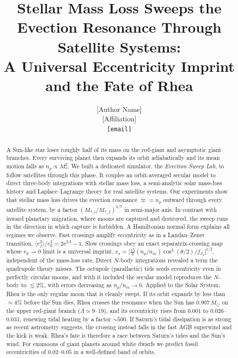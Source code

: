 \documentclass[11pt,a4paper]{article}
\title{\textbf{Stellar Mass Loss Sweeps the Evection Resonance Through Satellite Systems:\\ A Universal Eccentricity Imprint and the Fate of Rhea}}
\author{[Author Name]\\[2pt]
{\small [Affiliation]}\\
{\small \texttt{[email]}}}
\date{}
\newcommand{\estar}{e_\star}
\newcommand{\msun}{M_\odot}
\newcommand{\fJ}{f_{J_2}}
\begin{document}
\maketitle

\begin{abstract}
\noindent
A Sun-like star loses roughly half of its mass on the red-giant and asymptotic giant branches. Every surviving planet then expands its orbit adiabatically and its mean motion falls as $n_p\propto M_\ast^{2}$. We built a dedicated simulator, the \emph{Evection Sweep Lab}, to follow satellites through this phase. It couples an orbit-averaged secular model to direct three-body integrations with stellar mass loss, a semi-analytic solar mass-loss history and Laplace--Lagrange theory for real satellite systems. Our experiments show that stellar mass loss drives the evection resonance $\dot\varpi=n_p$ outward through every satellite system, by a factor $(M_{\ast,i}/M_{\ast,f})^{4/7}$ in semi-major axis. In contrast with inward planetary migration, where moons are captured and destroyed, the sweep runs in the direction in which capture is forbidden. A Hamiltonian normal form explains all regimes we observe. Fast crossings amplify eccentricity as in a Landau--Zener transition, $\langle e_f^2\rangle/e_0^2=2e^{2\Lambda}-1$. Slow crossings obey an exact separatrix-crossing map whose $e_0\to0$ limit is a universal imprint, $\estar=\big[\tfrac{15}{4}(n_p/n_m)\cos^4(\theta/2)/\fJ\big]^{1/2}$, independent of the mass-loss rate. Direct $N$-body integrations revealed a term the quadrupole theory misses. The octupole (parallactic) tide seeds eccentricity even in perfectly circular moons, and with it included the secular model reproduces the $N$-body to $\lesssim2\%$, with errors decreasing as $n_p/n_m\to0$. Applied to the Solar System, Rhea is the only regular moon that is cleanly swept. If its orbit expands by less than $\simeq4\%$ before the Sun dies, Rhea crosses the resonance when the Sun has $0.907\,\msun$ on the upper red-giant branch ($\Lambda\simeq9$--$19$), and its eccentricity rises from $0.001$ to $0.026$--$0.031$, renewing tidal heating by a factor $\sim500$. If Saturn's tidal dissipation is as strong as recent astrometry suggests, the crossing instead falls in the fast AGB superwind and the kick is weak. Rhea's fate is therefore a race between Saturn's tides and the Sun's wind. For exomoons of giant planets around white dwarfs we predict fossil eccentricities of $0.02$--$0.05$ in a well-defined band of orbits.
\end{abstract}
\end{document}
